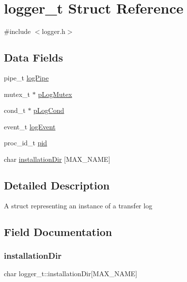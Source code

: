 \hypertarget{structlogger__t}{}\section{logger\+\_\+t Struct Reference}
\label{structlogger__t}


{\ttfamily \#include $<$logger.\+h$>$}

\subsection*{Data Fields}
\begin{DoxyCompactItemize}
\item 
pipe\+\_\+t \hyperlink{structlogger__t_a16890b7add5181dde0138ea916a8222c}{log\+Pipe}
\item 
mutex\+\_\+t $\ast$ \hyperlink{structlogger__t_ac1af7dd39e882cfeaffb4b77e2fa4fd7}{p\+Log\+Mutex}
\item 
cond\+\_\+t $\ast$ \hyperlink{structlogger__t_a573677c90c0100b6ad3697214016caf3}{p\+Log\+Cond}
\item 
event\+\_\+t \hyperlink{structlogger__t_a5305675a78acc22524aff8c7351904d7}{log\+Event}
\item 
proc\+\_\+id\+\_\+t \hyperlink{structlogger__t_a06d3329d87f49d3b73f7a805cfe5b61c}{pid}
\item 
char \hyperlink{structlogger__t_a366d6ff3012240669f28b0613f886c36}{installation\+Dir} \mbox{[}M\+A\+X\+\_\+\+N\+A\+ME\mbox{]}
\end{DoxyCompactItemize}


\subsection{Detailed Description}
A struct representing an instance of a transfer log 

\subsection{Field Documentation}
\mbox{\label{structlogger__t_a366d6ff3012240669f28b0613f886c36}} 
\subsubsection{\texorpdfstring{installation\+Dir}{installationDir}}
{\footnotesize\ttfamily char logger\+\_\+t\+::installation\+Dir\mbox{[}M\+A\+X\+\_\+\+N\+A\+ME\mbox{]}}

